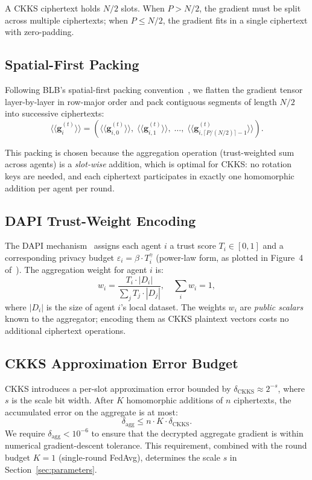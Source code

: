 \documentclass[letterpaper,journal]{IEEEtran}
\newcommand{\ct}[1]{\langle\!\langle #1 \rangle\!\rangle}
\newcommand{\eps}{\varepsilon}
\begin{document}
A CKKS ciphertext holds $N/2$ slots.
When $P > N/2$, the gradient must be split across multiple ciphertexts;
when $P \leq N/2$, the gradient fits in a single ciphertext with zero-padding.

\subsection{Spatial-First Packing}\label{sec:spatialfirst}

Following BLB's spatial-first packing convention~\cite{blb2025}, we flatten
the gradient tensor layer-by-layer in row-major order and pack contiguous
segments of length $N/2$ into successive ciphertexts:
\[
  \ct{\mathbf{g}_i^{(t)}} = \left(\ct{\mathbf{g}_{i,0}^{(t)}},\;
                                    \ct{\mathbf{g}_{i,1}^{(t)}},\;
                                    \ldots,\;
                                    \ct{\mathbf{g}_{i,\lceil P/(N/2) \rceil - 1}^{(t)}}\right).
\]

This packing is chosen because the aggregation operation (trust-weighted sum
across agents) is a \emph{slot-wise} addition, which is optimal for CKKS:
no rotation keys are needed, and each ciphertext participates in exactly one
homomorphic addition per agent per round.

\subsection{DAPI Trust-Weight Encoding}

The DAPI mechanism~\cite{frlconf2026} assigns each agent $i$ a trust
score $T_i \in [0,1]$ and a corresponding privacy budget
$\eps_i = \beta \cdot T_i^{\gamma}$ (power-law form, as plotted in Figure~4
of~\cite{frlconf2026}).
The aggregation weight for agent $i$ is:
\[
  w_i = \frac{T_i \cdot |D_i|}{\sum_{j} T_j \cdot |D_j|},
  \quad \sum_i w_i = 1,
\]
where $|D_i|$ is the size of agent $i$'s local dataset.
The weights $w_i$ are \emph{public scalars} known to the aggregator;
encoding them as CKKS plaintext vectors costs no additional ciphertext
operations.

\subsection{CKKS Approximation Error Budget}

CKKS introduces a per-slot approximation error bounded by
$\delta_{\text{CKKS}} \approx 2^{-s}$, where $s$ is the scale bit width.
After $K$ homomorphic additions of $n$ ciphertexts, the accumulated error
on the aggregate is at most:
\[
  \delta_{\text{agg}} \leq n \cdot K \cdot \delta_{\text{CKKS}}.
\]
We require $\delta_{\text{agg}} < 10^{-6}$ to ensure that the decrypted
aggregate gradient is within numerical gradient-descent tolerance.
This requirement, combined with the round budget $K=1$ (single-round FedAvg),
determines the scale $s$ in Section~\ref{sec:parameters}.
\end{document}
